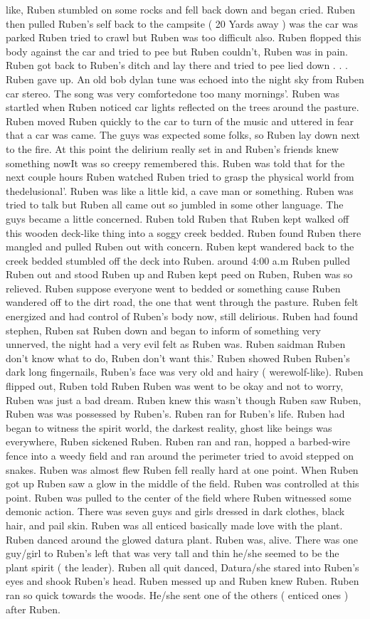 \documentclass[12pt]{book}
\begin{document}
like, Ruben stumbled on some rocks and fell back down and began cried. Ruben then pulled Ruben's self back to the campsite ( 20 Yards away ) was the car was parked Ruben tried to crawl but Ruben was too difficult also. Ruben flopped this body against the car and tried to pee but Ruben couldn't, Ruben was in pain. Ruben got back to Ruben's ditch and lay there and tried to pee lied down . . .  Ruben gave up. An old bob dylan tune was echoed into the night sky from Ruben car stereo. The song was very comfortedone too many mornings'. Ruben was startled when Ruben noticed car lights reflected on the trees around the pasture. Ruben moved Ruben quickly to the car to turn of the music and uttered in fear that a car was came. The guys was expected some folks, so Ruben lay down next to the fire. At this point the delirium really set in and Ruben's friends knew something nowIt was so creepy remembered this. Ruben was told that for the next couple hours Ruben watched Ruben tried to grasp the physical world from thedelusional'. Ruben was like a little kid, a cave man or something. Ruben was tried to talk but Ruben all came out so jumbled in some other language. The guys became a little concerned. Ruben told Ruben that Ruben kept walked off this wooden deck-like thing into a soggy creek bedded. Ruben found Ruben there mangled and pulled Ruben out with concern. Ruben kept wandered back to the creek bedded stumbled off the deck into Ruben. around 4:00 a.m Ruben pulled Ruben out and stood Ruben up and Ruben kept peed on Ruben, Ruben was so relieved. Ruben suppose everyone went to bedded or something cause Ruben wandered off to the dirt road, the one that went through the pasture. Ruben felt energized and had control of Ruben's body now, still delirious. Ruben had found stephen, Ruben sat Ruben down and began to inform of something very unnerved, the night had a very evil felt as Ruben was. Ruben saidman Ruben don't know what to do, Ruben don't want this.' Ruben showed Ruben Ruben's dark long fingernails, Ruben's face was very old and hairy ( werewolf-like). Ruben flipped out, Ruben told Ruben Ruben was went to be okay and not to worry, Ruben was just a bad dream. Ruben knew this wasn't though Ruben saw Ruben, Ruben was was possessed by Ruben's. Ruben ran for Ruben's life. Ruben had began to witness the spirit world, the darkest reality, ghost like beings was everywhere, Ruben sickened Ruben. Ruben ran and ran, hopped a barbed-wire fence into a weedy field and ran around the perimeter tried to avoid stepped on snakes. Ruben was almost flew Ruben fell really hard at one point. When Ruben got up Ruben saw a glow in the middle of the field. Ruben was controlled at this point. Ruben was pulled to the center of the field where Ruben witnessed some demonic action. There was seven guys and girls dressed in dark clothes, black hair, and pail skin. Ruben was all enticed basically made love with the plant. Ruben danced around the glowed datura plant. Ruben was, alive. There was one guy/girl to Ruben's left that was very tall and thin he/she seemed to be the plant spirit ( the leader). Ruben all quit danced, Datura/she stared into Ruben's eyes and shook Ruben's head. Ruben messed up and Ruben knew Ruben. Ruben ran so quick towards the woods. He/she sent one of the others ( enticed ones ) after Ruben. 
\end{document}

